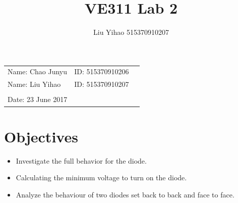 \documentclass{article}
\title{VE311 Lab 2}
\author{Liu Yihao 515370910207}
\date{}
\begin{document}
\vspace*{0.25cm}

\hrulefill

\thispagestyle{empty}

\begin{center}
\begin{large}
\end{large}

\hrulefill

\vspace*{5cm}
\begin{Large}
\end{Large}

\vspace{2em}

\begin{large}
\end{large}
\end{center}

\vfill

\begin{table}[h!]
\flushleft
\begin{tabular}{lll}
Name: Chao Junyu \hspace*{2em}&
ID: 515370910206\hspace*{2em}\\
Name: Liu Yihao \hspace*{2em}&
ID: 515370910207\hspace*{2em}\\
\\

Date: 23 June 2017 

\end{tabular}
\end{table}

\hfill

\newpage
\tableofcontents
\newpage

\section{Objectives}
\begin{itemize}
	\item Investigate the full behavior for the diode.
	\item Calculating the minimum voltage to turn on the diode.
	\item Analyze the behaviour of two diodes set back to back and face to face.
\end{itemize}
\end{document}
